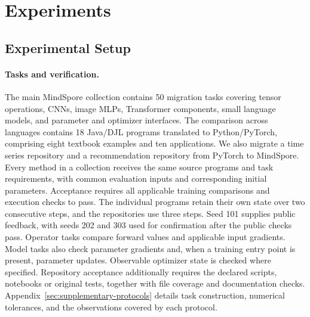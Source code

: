 \section{Experiments}

\subsection{Experimental Setup}
\label{sec:setup}

\paragraph{Tasks and verification.}
The main MindSpore collection contains 50 migration tasks covering tensor operations, CNNs, image MLPs, Transformer components, small language models, and parameter and optimizer interfaces. The comparison across languages contains 18 Java/DJL programs translated to Python/PyTorch, comprising eight textbook examples and ten applications. We also migrate a time series repository and a recommendation repository from PyTorch to MindSpore. Every method in a collection receives the same source programs and task requirements, with common evaluation inputs and corresponding initial parameters. Acceptance requires all applicable training comparisons and execution checks to pass. The individual programs retain their own state over two consecutive steps, and the repositories use three steps. Seed 101 supplies public feedback, with seeds 202 and 303 used for confirmation after the public checks pass. Operator tasks compare forward values and applicable input gradients. Model tasks also check parameter gradients and, when a training entry point is present, parameter updates. Observable optimizer state is checked where specified. Repository acceptance additionally requires the declared scripts, notebooks or original tests, together with file coverage and documentation checks. Appendix~\ref{sec:supplementary-protocols} details task construction, numerical tolerances, and the observations covered by each protocol.

